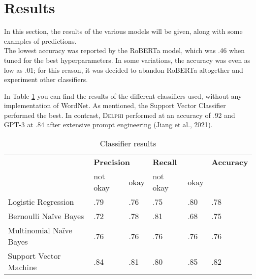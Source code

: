 \documentclass[final]{clv3} %
\begin{document}
\section{Results}

In this section, the results of the various models will be given, along with some examples of predictions.\\

The lowest accuracy was reported by the RoBERTa model, which was .46 when tuned for the best hyperparameters. In some variations, the accuracy was even as low as .01; for this reason, it was decided to abandon RoBERTa altogether and experiment other classifiers.

In Table \ref{tab:table-1} you can find the results of the different classifiers used, without any implementation of WordNet. As mentioned, the Support Vector Classifier performed the best. In contrast, \textsc{Delphi} performed at an accuracy of .92 and GPT-3 at .84 after extensive prompt engineering (Jiang et al., 2021).

\begin{table}[!hbtp]
\begin{tabular}{l|ll|ll|l|}
\cline{2-6}
                                              & \multicolumn{2}{l|}{\textbf{Precision}}       & \multicolumn{2}{l|}{\textbf{Recall}}          & \multirow{}{}{\textbf{Accuracy}} \\ \cline{2-5}
                                              & \multicolumn{1}{l|}{not okay} & okay & \multicolumn{1}{l|}{not okay} & okay &                           \\ \hline
\multicolumn{1}{|l|}{Logistic Regression}     & \multicolumn{1}{l|}{.79}      & .76  & \multicolumn{1}{l|}{.75}      & .80  & .78                       \\ \hline
\multicolumn{1}{|l|}{Bernoulli Naïve Bayes}   & \multicolumn{1}{l|}{.72}      & .78  & \multicolumn{1}{l|}{.81}      & .68  & .75                       \\ \hline
\multicolumn{1}{|l|}{Multinomial Naïve Bayes} & \multicolumn{1}{l|}{.76}      & .76  & \multicolumn{1}{l|}{.76}      & .76  & .76                       \\ \hline
\multicolumn{1}{|l|}{Support Vector Machine}  & \multicolumn{1}{l|}{.84}      & .81  & \multicolumn{1}{l|}{.80}      & .85  & .82                       \\ \hline
\end{tabular}
\caption{Classifier results}
\label{tab:table-1}
\end{table}\\
\end{document}
